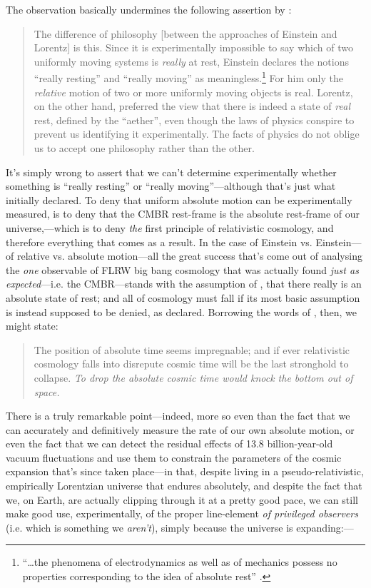 \documentclass[12 pt]{article}
\begin{document}
The observation basically undermines the following assertion by \citet{Bell1976}:
\begin{quotation}
The difference of philosophy [between the approaches of Einstein and Lorentz] is this. Since it is experimentally impossible to say which of two uniformly moving systems is \textit{really} at rest, Einstein declares the notions ``really resting'' and ``really moving'' as meaningless.\footnote{``\ldots the phenomena of electrodynamics as well as of mechanics possess no properties corresponding to the idea of absolute rest'' \citep{Einstein1905}.}  For him only the \textit{relative} motion of two or more uniformly moving objects is real. Lorentz, on the other hand, preferred the view that there is indeed a state of \textit{real} rest, defined by the ``aether'', even though the laws of physics conspire to prevent us identifying it experimentally. The facts of physics do not oblige us to accept one philosophy rather than the other.
\end{quotation}
It's simply wrong to assert that we can't determine experimentally whether something is ``really resting'' or ``really moving''---although that's just what \citet{Einstein1905} initially declared. To deny that uniform absolute motion can be experimentally measured, is to deny that the CMBR rest-frame is the absolute rest-frame of our universe,---which is to deny \textit{the} first principle of relativistic cosmology, and therefore everything that comes as a result. In the case of Einstein vs. Einstein---of relative vs. absolute motion---all the great success that's come out of analysing the \textit{one} observable of FLRW big bang cosmology that was actually found \textit{just as expected}---i.e. the CMBR---stands with the assumption of \citet{Einstein1917,Einstein1945}, that there really is an absolute state of rest; and all of cosmology must fall if its most basic assumption is instead supposed to be denied, as \citet{Einstein1905} declared.  Borrowing the words of \citet[p.~104]{Eddington1933}, then, we might state: 
\begin{quote}
The position of absolute time seems impregnable; and if ever relativistic cosmology falls into disrepute cosmic time will be the last stronghold to collapse. \textit{To drop the absolute cosmic time would knock the bottom out of space.}
\end{quote}

There is a truly remarkable point---indeed, more so even than the fact that we can accurately and definitively measure the rate of our own absolute motion, or even the fact that we can detect the residual effects of 13.8 billion-year-old vacuum fluctuations and use them to constrain the parameters of the cosmic expansion that's since taken place---in that, despite living in a pseudo-relativistic, empirically Lorentzian universe that endures absolutely, and despite the fact that we, on Earth, are actually clipping through it at a pretty good pace, we can still make good use, experimentally, of the proper line-element \textit{of privileged observers} (i.e. which is something we \textit{aren't}), simply because the universe is expanding:---
\end{document}
